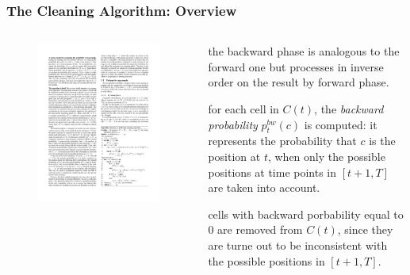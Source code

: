 
\begin{frame}
\frametitle{The Cleaning Algorithm: Overview}

\begin{columns}

  \begin{figure}[tb]
    \includegraphics[width=\columnwidth]{figures/3-4/3-4-16.pdf}
  \end{figure}

  \begin{sitemize}
    \item the backward phase is analogous to the forward one but processes in inverse order on the result by forward phase.
    \item for each cell in $C(t)$, the \emph{backward probability} $p^{bw}_t(c)$ is computed: it represents the probability that $c$ is the position at $t$, when only the possible positions at time points in $[t+1,T]$ are taken into account.
    \item cells with backward porbability equal to $0$ are removed from $C(t)$, since they are turne out to be inconsistent with the possible positions in $[t+1,T]$.
  \end{sitemize}

\end{columns}

\end{frame}

